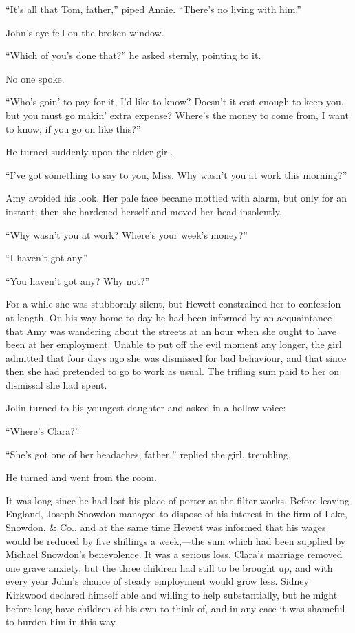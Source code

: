 ``It's all that Tom, father,'' piped Annie. ``There's no living with
him.''

John's eye fell on the broken window.

``Which of you's done that?'' he asked sternly, pointing to it.

No one spoke.

``Who's goin' to pay for it, I'd like to know? Doesn't it cost enough to
keep you, {}but you must go makin' extra expense? Where's the money to
come from, I want to know, if you go on like this?''

He turned suddenly upon the elder girl.

``I've got something to say to you, Miss. Why wasn't you at work this
morning?''

Amy avoided his look. Her pale face became mottled with alarm, but only
for an instant; then she hardened herself and moved her head insolently.

``Why wasn't you at work? Where's your week's money?''

``I haven't got any.''

``You haven't got any? Why not?''

For a while she was stubbornly silent, but Hewett constrained her to
confession at length. On his way home to-day he had been informed by an
acquaintance that Amy was wandering about the streets at an hour when
she ought to have been at her employment. Unable to put off the evil
moment any longer, the girl admitted that four days ago she was
dismissed for bad behaviour, and that since then she had pretended to go
to work as usual. The trifling sum paid to her on dismissal she had
spent.

{}Jolin turned to his youngest daughter and asked in a hollow voice:

``Where's Clara?''

``She's got one of her headaches, father,'' replied the girl, trembling.

He turned and went from the room.

It was long since he had lost his place of porter at the filter-works.
Before leaving England, Joseph Snowdon managed to dispose of his
interest in the firm of Lake, Snowdon, \& Co., and at the same time
Hewett was informed that his wages would be reduced by five shillings a
week,---the sum which had been supplied by Michael Snowdon's
benevolence. It was a serious loss. Clara's marriage removed one grave
anxiety, but the three children had still to be brought up, and with
every year John's chance of steady employment would grow less. Sidney
Kirkwood declared himself able and willing to help substantially, but he
might before long have children of his own to think of, and in any case
it was shameful to burden him in this way.

